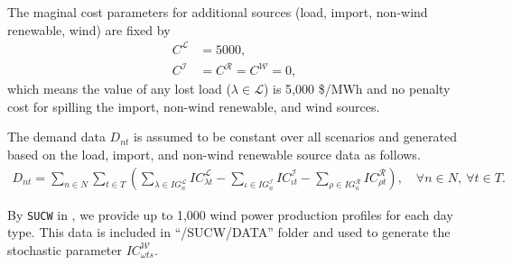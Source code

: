 The maginal cost parameters for additional sources (load, import, non-wind renewable, wind) are fixed by
\begin{align*}
C^\mathcal{L}&=5000,\\
C^\mathcal{I}&=C^\mathcal{R}=C^\mathcal{W}=0,
\end{align*}
which means the value of any lost load ($\lambda\in\mathcal{L}$) is 5,000 \$/MWh and no penalty cost for spilling the import, non-wind renewable, and wind sources.

The demand data $D_{nt}$ is assumed to be constant over all scenarios and generated based on the load, import, and non-wind renewable source data as follows.
\begin{align*}
D_{nt}=\sum_{n\in N} \sum_{t\in T}\left(  \sum_{\lambda\in IG_n^\mathcal{L}}IC_{\lambda t}^\mathcal{L} - \sum_{\iota\in IG_n^\mathcal{I}}IC_{\iota t}^\mathcal{I} - \sum_{\rho\in IG_n^\mathcal{R}}IC_{\rho t}^\mathcal{R}    \right),\quad\forall n\in N,\ \forall t\in T.
\end{align*}

By \texttt{SUCW} in \siplibtwo, we provide up to 1,000 wind power production profiles for each day type. This data is included in ``/SUCW/DATA'' folder and used to generate the stochastic parameter $IC_{\omega ts}^\mathcal{W}$.